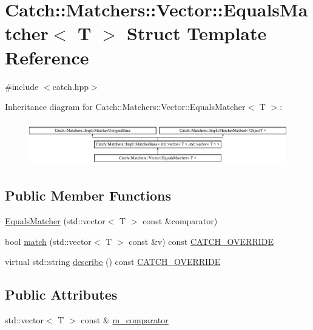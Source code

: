 \hypertarget{struct_catch_1_1_matchers_1_1_vector_1_1_equals_matcher}{}\section{Catch\+:\+:Matchers\+:\+:Vector\+:\+:Equals\+Matcher$<$ T $>$ Struct Template Reference}
\label{struct_catch_1_1_matchers_1_1_vector_1_1_equals_matcher}


{\ttfamily \#include $<$catch.\+hpp$>$}

Inheritance diagram for Catch\+:\+:Matchers\+:\+:Vector\+:\+:Equals\+Matcher$<$ T $>$\+:\begin{figure}[H]
\begin{center}
\leavevmode
\includegraphics[height=1.944444cm]{struct_catch_1_1_matchers_1_1_vector_1_1_equals_matcher}
\end{center}
\end{figure}
\subsection*{Public Member Functions}
\begin{DoxyCompactItemize}
\item 
\mbox{\hyperlink{struct_catch_1_1_matchers_1_1_vector_1_1_equals_matcher_a3846c47780d1991dcfe87aefded98008}{Equals\+Matcher}} (std\+::vector$<$ T $>$ const \&comparator)
\item 
bool \mbox{\hyperlink{struct_catch_1_1_matchers_1_1_vector_1_1_equals_matcher_aca444c319d1b4c6f538faf9c4735da04}{match}} (std\+::vector$<$ T $>$ const \&v) const \mbox{\hyperlink{catch_8hpp_a8ecdce4d3f57835f707915ae831eb847}{C\+A\+T\+C\+H\+\_\+\+O\+V\+E\+R\+R\+I\+DE}}
\item 
virtual std\+::string \mbox{\hyperlink{struct_catch_1_1_matchers_1_1_vector_1_1_equals_matcher_aca79ade26f4a75b2a57005067e086e35}{describe}} () const \mbox{\hyperlink{catch_8hpp_a8ecdce4d3f57835f707915ae831eb847}{C\+A\+T\+C\+H\+\_\+\+O\+V\+E\+R\+R\+I\+DE}}
\end{DoxyCompactItemize}
\subsection*{Public Attributes}
\begin{DoxyCompactItemize}
\item 
std\+::vector$<$ T $>$ const  \& \mbox{\hyperlink{struct_catch_1_1_matchers_1_1_vector_1_1_equals_matcher_a56f7aa6f110a12b1b9aeb0cabbc9d755}{m\+\_\+comparator}}
\end{DoxyCompactItemize}
